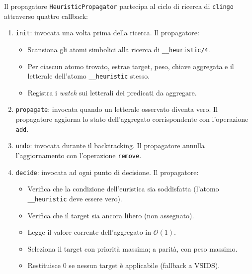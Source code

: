 \documentclass[a4paper,12pt,twoside,openright]{report}
\newcommand{\clingo}{\texttt{clingo}}
\newcommand{\vsids}{\textsc{VSIDS}}
\newcommand{\hprop}{\texttt{HeuristicPropagator}}
\begin{document}
Il propagatore \hprop{} partecipa al ciclo di ricerca di \clingo{} attraverso quattro callback:

\begin{enumerate}
    \item \texttt{init}: invocata una volta prima della ricerca. Il propagatore:
    \begin{itemize}
        \item Scansiona gli atomi simbolici alla ricerca di \texttt{\_\_heuristic/4}.
        \item Per ciascun atomo trovato, estrae target, peso, chiave aggregata e il letterale dell'atomo \texttt{\_\_heuristic} stesso.
        \item Registra i \emph{watch} sui letterali dei predicati da aggregare.
    \end{itemize}

    \item \texttt{propagate}: invocata quando un letterale osservato diventa vero. Il propagatore aggiorna lo stato dell'aggregato corrispondente con l'operazione \texttt{add}.

    \item \texttt{undo}: invocata durante il backtracking. Il propagatore annulla l'aggiornamento con l'operazione \texttt{remove}.

    \item \texttt{decide}: invocata ad ogni punto di decisione. Il propagatore:
    \begin{itemize}
        \item Verifica che la condizione dell'euristica sia soddisfatta (l'atomo \texttt{\_\_heuristic} deve essere vero).
        \item Verifica che il target sia ancora libero (non assegnato).
        \item Legge il valore corrente dell'aggregato in $\mathcal{O}(1)$.
        \item Seleziona il target con priorit\`{a} massima; a parit\`{a}, con peso massimo.
        \item Restituisce $0$ se nessun target \`{e} applicabile (fallback a \vsids{}).
    \end{itemize}
\end{enumerate}
\end{document}

